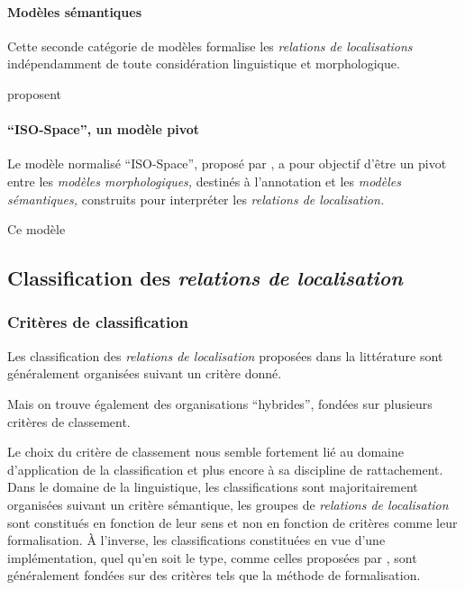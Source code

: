 \paragraph{Modèles sémantiques}

Cette seconde catégorie de modèles formalise les \emph{relations de
  localisations} indépendamment de toute considération linguistique
et morphologique.

\textcite{Aurngague1997} proposent

\autocite{Bateman2010}

\paragraph{\enquote{ISO-Space}, un modèle pivot}

Le modèle normalisé \enquote{ISO-Space}, proposé par
\textcite{Pustejovsky2017}, a pour objectif d'être un pivot entre les
\emph{modèles morphologiques,} destinés à l'annotation et les
\emph{modèles sémantiques,} construits pour interpréter les
\emph{relations de localisation.}

Ce modèle 


\subsection{Classification des \emph{relations de localisation}}

\subsubsection{Critères de classification}

Les classification des \emph{relations de localisation} proposées dans
la littérature sont généralement organisées suivant un critère donné.

Mais on trouve également des organisations \enquote{hybrides}, fondées
sur plusieurs critères de classement.

Le choix du critère de classement nous semble fortement lié au domaine
d’application de la classification et plus encore à sa discipline de
rattachement. Dans le domaine de la linguistique, les classifications
sont majoritairement organisées suivant un critère sémantique, les
groupes de \emph{relations de localisation} sont constitués en
fonction de leur sens et non en fonction de critères comme leur
formalisation. À l'inverse, les classifications constituées en vue
d'une implémentation, quel qu'en soit le type, comme celles proposées
par \textcite{Hudelot2008a,Bloch2013}, sont généralement fondées sur
des critères tels que la méthode de formalisation.

